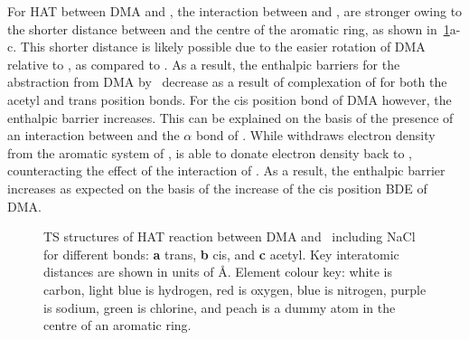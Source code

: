 For HAT between DMA and \bno, the interaction between  and \bno, are stronger owing to the shorter distance between  and the centre of the aromatic ring, as shown in~\ref{fig:dma-bno-ts}a-c. This shorter distance is likely possible due to the easier rotation of DMA relative to \bno, as compared to \cumo. As a result, the enthalpic barriers for the abstraction from DMA by \bno\ decrease as a result of complexation of  for both the acetyl and trans position  bonds. For the cis position  bond of DMA however, the enthalpic barrier increases. This can be explained on the basis of the presence of an interaction between  and the $\alpha$ bond of \bno. While  withdraws electron density from the aromatic system of \bno,  is able to donate electron density back to \bno, counteracting the effect of the interaction of . As a result, the enthalpic barrier increases as expected on the basis of the increase of the cis position  BDE of DMA.

\begin{figure}
  \centering



  \caption[TS structures of HAT reaction between DMA and \bno\ including NaCl.]{TS structures of HAT reaction between DMA and \bno\ including NaCl for different  bonds: \textbf{a} trans, \textbf{b} cis, and \textbf{c} acetyl. Key interatomic distances are shown in units of \AA. Element colour key: white is carbon, light blue is hydrogen, red is oxygen, blue is nitrogen, purple is sodium, green is chlorine, and peach is a dummy atom in the centre of an aromatic ring.}
  \label{fig:dma-bno-ts}
\end{figure}

